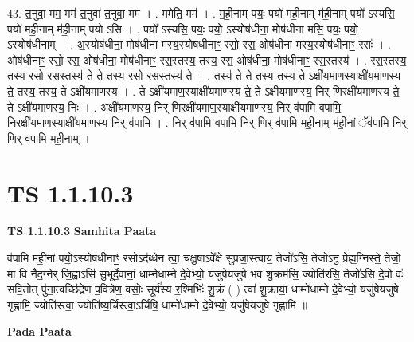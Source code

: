 \documentclass[17pt]{extarticle}
\begin{document}
43. त॒नुवा॒ मम॒ मम॑ त॒नुवा॑ त॒नुवा॒ मम॑ । . ममेति॒ मम॑ । . म॒ही॒नाम् पयः॒ पयो॑ मही॒नाम् म॑ही॒नाम् पयो᳚ ऽस्यसि॒ पयो॑ मही॒नाम् म॑ही॒नाम् पयो॑ ऽसि । . पयो᳚ ऽस्यसि॒ पयः॒ पयो॒ ऽस्योष॑धीना॒ मोष॑धीना मसि॒ पयः॒ पयो॒ ऽस्योष॑धीनाम् । . अ॒स्योष॑धीना॒ मोष॑धीना मस्य॒स्योष॑धीनाꣳ॒॒ रसो॒ रस॒ ओष॑धीना मस्य॒स्योष॑धीनाꣳ॒॒ रसः॑ । . ओष॑धीनाꣳ॒॒ रसो॒ रस॒ ओष॑धीना॒ मोष॑धीनाꣳ॒॒ रस॒स्तस्य॒ तस्य॒ रस॒ ओष॑धीना॒ मोष॑धीनाꣳ॒॒ रस॒स्तस्य॑ । . रस॒स्तस्य॒ तस्य॒ रसो॒ रस॒स्तस्य॑ ते ते॒ तस्य॒ रसो॒ रस॒स्तस्य॑ ते । . तस्य॑ ते ते॒ तस्य॒ तस्य॒ ते ऽक्षी॑यमाण॒स्याक्षी॑यमाणस्य ते॒ तस्य॒ तस्य॒ ते ऽक्षी॑यमाणस्य । . ते ऽक्षी॑यमाण॒स्याक्षी॑यमाणस्य ते॒ ते ऽक्षी॑यमाणस्य॒ निर् णिरक्षी॑यमाणस्य ते॒ ते ऽक्षी॑यमाणस्य॒ निः । . अक्षी॑यमाणस्य॒ निर् णिरक्षी॑यमाण॒स्याक्षी॑यमाणस्य॒ निर् व॑पामि वपामि॒ निरक्षी॑यमाण॒स्याक्षी॑यमाणस्य॒ निर् व॑पामि । . निर् व॑पामि वपामि॒ निर् णिर् व॑पामि मही॒नाम् म॑ही॒नां ॅव॑पामि॒ निर् णिर् व॑पामि मही॒नाम् । \newline
\pagebreak
{}

\section{ TS 1.1.10.3 }

\textbf{TS 1.1.10.3 } \newline
\textbf{Samhita Paata} \newline

व॑पामि मही॒नां पयो॒ऽस्योष॑धीनाꣳ॒॒ रसोऽद॑ब्धेन त्वा॒ चक्षु॒षाऽवे᳚क्षे सुप्रजा॒स्त्वाय॒ तेजो॑ऽसि॒ तेजोऽनु॒ प्रेह्य॒ग्निस्ते॒ तेजो॒ मा वि नै॑द॒ग्नेर् जि॒ह्वाऽसि॑ सु॒भूर्दे॒वानां॒ धाम्ने॑धाम्ने दे॒वेभ्यो॒ यजु॑षेयजुषे भव शु॒क्रम॑सि॒ ज्योति॑रसि॒ तेजो॑ऽसि दे॒वो वः॑ सवि॒तोत् पु॑ना॒त्वच्छि॑द्रेण प॒वित्रे॑ण॒ वसोः॒ सूर्य॑स्य र॒श्मिभिः॑ शु॒क्रं ( ) त्वा॑ शु॒क्रायां॒ धाम्ने॑धाम्ने दे॒वेभ्यो॒ यजु॑षेयजुषे गृह्णामि॒ ज्योति॑स्त्वा॒ ज्योति॑ष्य॒र्चिस्त्वा॒ऽर्चिषि॒ धाम्ने॑धाम्ने दे॒वेभ्यो॒ यजु॑षेयजुषे गृह्णामि ॥ \newline

\textbf{Pada Paata} \newline
\end{document}
